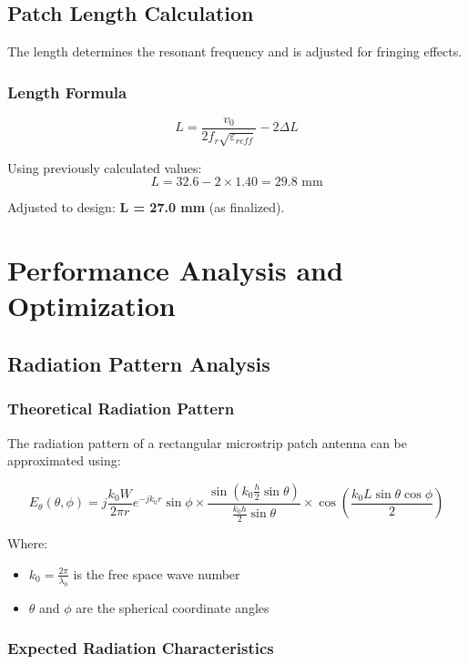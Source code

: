 \documentclass[12pt]{article}
\begin{document}
\subsection{Patch Length Calculation}

The length determines the resonant frequency and is adjusted for fringing effects.

\subsubsection{Length Formula}

\[L = \frac{v_0}{2f_r\sqrt{\varepsilon_{reff}}} - 2\Delta L\]

Using previously calculated values:
\[L = 32.6 - 2 \times 1.40 = 29.8 \text{ mm}\]

Adjusted to design: \textbf{L = 27.0 mm} (as finalized).

\section{Performance Analysis and Optimization}

\subsection{Radiation Pattern Analysis}

\subsubsection{Theoretical Radiation Pattern}

The radiation pattern of a rectangular microstrip patch antenna can be approximated using:

\[E_\theta(\theta,\phi) = j\frac{k_0W}{2\pi r}e^{-jk_0r}\sin\phi \times \frac{\sin(k_0\frac{h}{2}\sin\theta)}{\frac{k_0h}{2}\sin\theta} \times \cos\left(\frac{k_0L\sin\theta\cos\phi}{2}\right)\]

Where:
\begin{itemize}
    \item $k_0 = \frac{2\pi}{\lambda_0}$ is the free space wave number
    \item $\theta$ and $\phi$ are the spherical coordinate angles
\end{itemize}

\subsubsection{Expected Radiation Characteristics}
\end{document}
